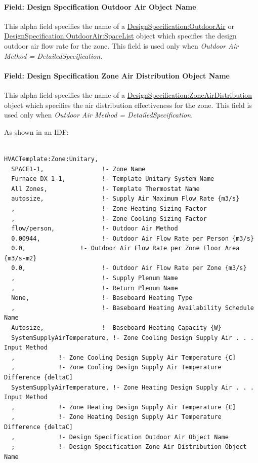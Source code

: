 \paragraph{Field: Design Specification Outdoor Air Object Name}\label{field-design-specification-outdoor-air-object-name-7}

This alpha field specifies the name of a \hyperref[designspecificationoutdoorair]{DesignSpecification:OutdoorAir} or \hyperref[designspecificationoutdoorairspacelist]{DesignSpecification:OutdoorAir:SpaceList} object which specifies the design outdoor air flow rate for the zone. This field is used only when \emph{Outdoor Air Method = DetailedSpecification}.

\paragraph{Field: Design Specification Zone Air Distribution Object Name}\label{field-design-specification-zone-air-distribution-object-name-6}

This alpha field specifies the name of a \hyperref[designspecificationzoneairdistribution]{DesignSpecification:ZoneAirDistribution} object which specifies the air distribution effectiveness for the zone. This field is used only when \emph{Outdoor Air Method = DetailedSpecification}.

As shown in an IDF:

\begin{lstlisting}

HVACTemplate:Zone:Unitary,
  SPACE1-1,                !- Zone Name
  Furnace DX 1-1,          !- Template Unitary System Name
  All Zones,               !- Template Thermostat Name
  autosize,                !- Supply Air Maximum Flow Rate {m3/s}
  ,                        !- Zone Heating Sizing Factor
  ,                        !- Zone Cooling Sizing Factor
  flow/person,             !- Outdoor Air Method
  0.00944,                 !- Outdoor Air Flow Rate per Person {m3/s}
  0.0,               !- Outdoor Air Flow Rate per Zone Floor Area {m3/s-m2}
  0.0,                     !- Outdoor Air Flow Rate per Zone {m3/s}
  ,                        !- Supply Plenum Name
  ,                        !- Return Plenum Name
  None,                    !- Baseboard Heating Type
  ,                        !- Baseboard Heating Availability Schedule Name
  Autosize,                !- Baseboard Heating Capacity {W}
  SystemSupplyAirTemperature, !- Zone Cooling Design Supply Air . . . Input Method
  ,            !- Zone Cooling Design Supply Air Temperature {C]
  ,            !- Zone Cooling Design Supply Air Temperature Difference {deltaC]
  SystemSupplyAirTemperature, !- Zone Heating Design Supply Air . . . Input Method
  ,            !- Zone Heating Design Supply Air Temperature {C]
  ,            !- Zone Heating Design Supply Air Temperature Difference {deltaC]
  ,            !- Design Specification Outdoor Air Object Name
  ;            !- Design Specification Zone Air Distribution Object Name
\end{lstlisting}

